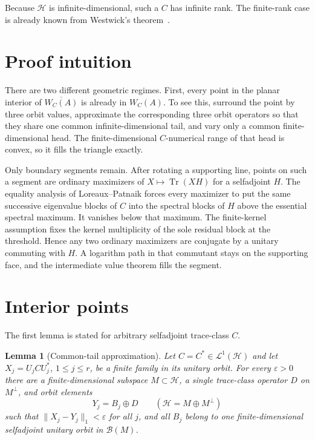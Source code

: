 \documentclass[11pt]{article}
\newtheorem{lemma}[theorem]{Lemma}
\newcommand{\HH}{\mathcal H}
\newcommand{\B}{\mathcal B}
\newcommand{\Lone}{\mathcal L^1}
\newcommand{\Tr}{\operatorname{Tr}}
\newcommand{\clos}[1]{\overline{#1}}
\begin{document}
Because $\HH$ is infinite-dimensional, such a $C$ has infinite rank.  The
finite-rank case is already known from Westwick's theorem~\cite{Westwick}.

\section{Proof intuition}

There are two different geometric regimes.  First, every point in the planar
interior of $\clos{W_C(A)}$ is already in $W_C(A)$.  To see this, surround the
point by three orbit values, approximate the corresponding three orbit
operators so that they share one common infinite-dimensional tail, and vary
only a common finite-dimensional head.  The finite-dimensional
$C$-numerical range of that head is convex, so it fills the triangle exactly.

Only boundary segments remain.  After rotating a supporting line, points on
such a segment are ordinary maximizers of $X\mapsto\Tr(XH)$ for a selfadjoint
$H$.  The equality analysis of Loreaux--Patnaik forces every maximizer to put
the same successive eigenvalue blocks of $C$ into the spectral blocks of $H$
above the essential spectral maximum.  It vanishes below that maximum.  The
finite-kernel assumption fixes the kernel multiplicity of the sole residual
block at the threshold.  Hence any two ordinary maximizers are conjugate by a
unitary commuting with $H$.  A logarithm path in that commutant stays on the
supporting face, and the intermediate value theorem fills the segment.

\section{Interior points}

The first lemma is stated for arbitrary selfadjoint trace-class $C$.

\begin{lemma}[Common-tail approximation]\label{lem:tail}
Let $C=C^*\in\Lone(\HH)$ and let $X_j=U_jCU_j^*$, $1\leq j\leq r$, be a
finite family in its unitary orbit.  For every $\varepsilon>0$ there are a
finite-dimensional subspace $M\subset\HH$, a single trace-class operator
$D$ on $M^\perp$, and orbit elements
\[
  Y_j=B_j\oplus D \qquad (\HH=M\oplus M^\perp)
\]
such that $\|X_j-Y_j\|_1<\varepsilon$ for all $j$, and all $B_j$ belong to
one finite-dimensional selfadjoint unitary orbit in $\B(M)$.
\end{lemma}
\end{document}
